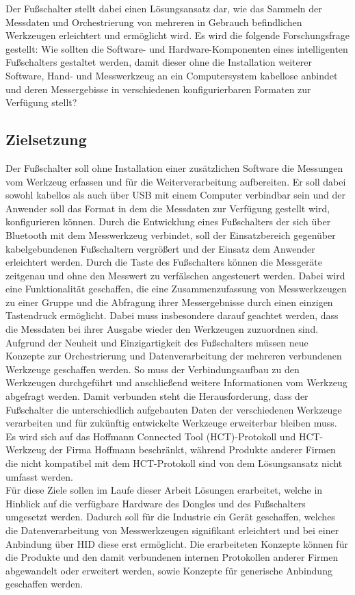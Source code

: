 Der Fußschalter stellt dabei einen Lösungsansatz dar, wie das Sammeln der Messdaten und Orchestrierung von mehreren in Gebrauch befindlichen Werkzeugen erleichtert und ermöglicht wird. Es wird die folgende Forschungsfrage gestellt: Wie sollten die Software- und Hardware-Komponenten eines intelligenten Fußschalters gestaltet werden, damit dieser ohne die Installation weiterer Software, Hand- und Messwerkzeug an ein Computersystem kabellose anbindet und deren Messergebisse in verschiedenen konfigurierbaren Formaten zur Verfügung stellt?

\subsection{Zielsetzung}
Der Fußschalter soll ohne Installation einer zusätzlichen Software die Messungen vom Werkzeug erfassen und für die Weiterverarbeitung aufbereiten. Er soll dabei sowohl kabellos als auch über USB mit einem Computer verbindbar sein und der Anwender soll das Format in dem die Messdaten zur Verfügung gestellt wird, konfigurieren können. Durch die Entwicklung eines Fußschalters der sich über Bluetooth mit dem Messwerkzeug verbindet, soll der Einsatzbereich gegenüber kabelgebundenen Fußschaltern vergrößert und der Einsatz dem Anwender erleichtert werden. Durch die Taste des Fußschalters können die Messgeräte zeitgenau und ohne den Messwert zu verfälschen angesteuert werden. Dabei wird eine Funktionalität geschaffen, die eine Zusammenzufassung von Messwerkzeugen zu einer Gruppe und die Abfragung ihrer Messergebnisse durch einen einzigen Tastendruck ermöglicht. Dabei muss insbesondere darauf geachtet werden, dass die Messdaten bei ihrer Ausgabe wieder den Werkzeugen zuzuordnen sind.\\
Aufgrund der Neuheit und Einzigartigkeit des Fußschalters müssen neue Konzepte zur Orchestrierung und Datenverarbeitung der mehreren verbundenen Werkzeuge geschaffen werden. So muss der Verbindungsaufbau zu den Werkzeugen durchgeführt und anschließend weitere Informationen vom Werkzeug abgefragt werden. Damit verbunden steht die Herausforderung, dass der Fußschalter die unterschiedlich aufgebauten Daten der verschiedenen Werkzeuge verarbeiten und für zukünftig entwickelte Werkzeuge erweiterbar bleiben muss. Es wird sich auf das Hoffmann Connected Tool (\ac{HCT})-Protokoll und \ac{HCT}-Werkzeug der Firma Hoffmann beschränkt, während Produkte anderer Firmen die nicht kompatibel mit dem \ac{HCT}-Protokoll sind von dem Lösungsansatz nicht umfasst werden.\\
Für diese Ziele sollen im Laufe dieser Arbeit Lösungen erarbeitet, welche in Hinblick auf die verfügbare Hardware des Dongles und des Fußschalters umgesetzt werden. Dadurch soll für die Industrie ein Gerät geschaffen, welches die Datenverarbeitung von Messwerkzeugen signifikant erleichtert und bei einer Anbindung über \ac{HID} diese erst ermöglicht. Die erarbeiteten Konzepte können für die Produkte und den damit verbundenen internen Protokollen anderer Firmen abgewandelt oder erweitert werden, sowie Konzepte für generische Anbindung geschaffen werden.

